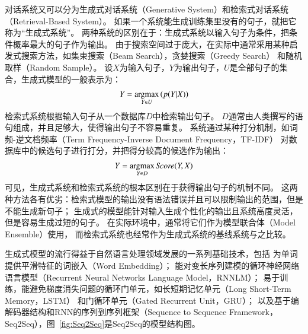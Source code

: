 对话系统又可以分为生成式对话系统（Generative System）和检索式对话系统（Retrieval-Based System）。
如果一个系统能生成训练集里没有的句子，就把它称为“生成式系统”。
两种系统的区别在于：生成式系统以输入句子为条件，把条件概率最大的句子作为输出。
由于搜索空间过于庞大，在实际中通常采用某种启发式搜索方法，如集束搜索（Beam Search），贪婪搜索（Greedy Search）
和随机取样（Random Sample）。
设$X$为输入句子，$Y$为输出句子，$U$是全部句子的集合，生成式模型的一般表示为：
\begin{align}
    Y = \operatorname*{argmax}_{Y\in U} \left(p(Y|X)\right)
\end{align}
检索式系统根据输入句子从一个数据库$D$中检索输出句子。
$D$通常由人类撰写的语句组成，并且足够大，使得输出句子不容易重复。
系统通过某种打分机制，如词频-逆文档频率（Term Frequency-Inverse Document Frequency，TF-IDF）
对数据库中的候选句子进行打分，并把得分较高的候选作为输出：
\begin{align}
    Y = \operatorname*{argmax}_{Y\in D} \textit{Score}(Y, X)
\end{align}
可见，生成式系统和检索式系统的根本区别在于获得输出句子的机制不同。
这两种方法各有优劣：检索式模型的输出没有语法错误并且可以限制输出的范围，但是不能生成新句子；
生成式的模型能针对输入生成个性化的输出且系统高度灵活，但是容易生成过短的句子。
在实际环境中，通常将它们作为模型联合体（Model Ensemble）使用，
而检索式系统也经常作为生成式系统的基线系统与之比较。

生成式模型的流行得益于自然语言处理领域发展的一系列基础技术，包括
为单词提供平滑特征的词嵌入（Word Embedding）；
能对变长序列建模的循环神经网络语言模型（Recurrent Neural Networks Language Model，RNNLM）；
易于训练，能避免梯度消失问题的循环门单元，如长短期记忆单元（Long Short-Term Memory，LSTM）
和门循环单元（Gated Recurrent Unit，GRU）；
以及基于编解码器结构和RNN的序列到序列框架（Sequence to Sequence Framework，Seq2Seq），图~\ref{fig:Seq2Seq}是Seq2Seq的模型结构图。

